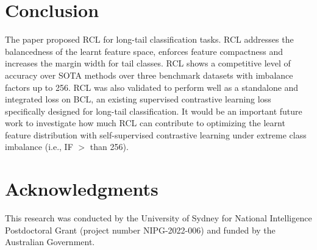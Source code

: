 \section{Conclusion}
The paper proposed RCL for long-tail classification tasks. RCL addresses the balancedness of the learnt feature space,
enforces feature compactness and increases the margin width for tail classes. RCL shows a competitive level of accuracy 
over SOTA methods over three benchmark datasets with imbalance factors up to 256. RCL was also validated to perform well as a standalone and integrated loss on BCL, an existing supervised contrastive learning loss specifically designed for long-tail classification. It would be an important future work to investigate how much RCL can contribute to optimizing the learnt feature distribution with self-supervised contrastive learning under extreme class imbalance (i.e., IF $>$ than 256). 

\section*{Acknowledgments}
This research was conducted by the University of Sydney for National Intelligence Postdoctoral Grant (project number NIPG-2022-006) and funded by the Australian Government.


